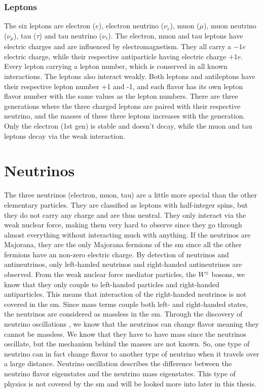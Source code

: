 \documentclass[a4paper, american, 12pt]{report}
\begin{document}
	
	\subsubsection{Leptons}
	\label{subsubsect:Theory-Leptons}
	The six leptons are electron ($e$), electron neutrino ($\nu_e$), muon ($\mu$), muon neutrino ($\nu_{\mu}$), tau ($\tau$) and tau neutrino ($\nu_{\tau}$). The electron, muon and tau leptons have electric charges and are influenced by electromagnetism. They all carry a $-1e$ electric charge, while their respective antiparticle having electric charge $+1e$. Every lepton carrying a lepton number, which is conserved in all known interactions. The leptons also interact weakly. Both leptons and antileptons have their respective lepton number +1 and -1, and each flavor has its own lepton flavor number with the same values as the lepton numbers. There are three generations where the three charged leptons are paired with their respective neutrino, and the masses of these three leptons increases with the generation. Only the electron (1st gen) is stable and doesn't decay, while the muon and tau leptons decay via the weak interaction.
	

	\section{Neutrinos}
	\label{sect:Theory-Neutrino}
	The three neutrinos (electron, muon, tau) are a little more special than the other elementary particles. They are classified as leptons with half-integer spins, but they do not carry any charge and are thus neutral. They only interact via the weak nuclear force, making them very hard to observe since they go through almost everything without interacting much with anything. If the neutrinos are Majorana, they are the only Majorana fermions of the \acrshort{sm} since all the other fermions have an non-zero electric charge. By detection of neutrinos and antineutrinos, only left-handed neutrinos and right-handed antineutrinos are observed. From the weak nuclear force mediator particles, the $W^{\pm}$ bosons, we know that they only couple to left-handed particles and right-handed antiparticles. This means that interaction of the right-handed neutrinos is not covered in the \acrshort{sm}. Since mass terms couple both left- and right-handed states, the neutrinos are considered as massless in the \acrshort{sm}. Through the discovery of neutrino oscillations \cite{NeutrionOscillation}, we know that the neutrinos can change flavor meaning they cannot be massless. We know that they have to have mass since the neutrinos oscillate, but the mechanism behind the masses are not known. So, one type of neutrino can in fact change flavor to another type of neutrino when it travels over a large distance. Neutrino oscillation describes the difference between the neutrino flavor eigenstates and the neutrino mass eigenstates. This type of physics is not covered by the \acrshort{sm} and will be looked more into later in this thesis.
	
\end{document}
